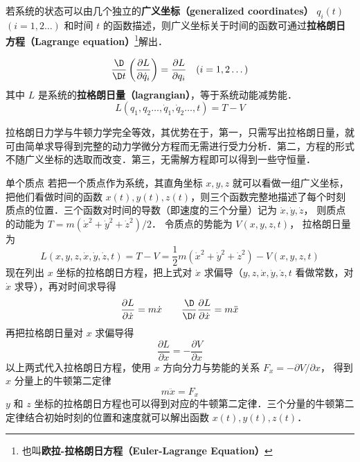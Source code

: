 

若系统的状态可以由几个独立的\textbf{广义坐标（generalized coordinates）} $q_i(t)$ $(i=1,2\dots)$ 和时间 $t$ 的函数描述，则广义坐标关于时间的函数可通过\textbf{拉格朗日方程（Lagrange equation）}\footnote{也叫\textbf{欧拉-拉格朗日方程（Euler-Lagrange Equation）}}解出．

\begin{equation}
\frac{\D}{{\D t}}\left( {\frac{{\partial L}}{{\partial \dot q_i}}} \right) = \frac{{\partial L}}{{\partial q_i}}
\quad (i=1,2\dots)
\end{equation}
其中 $L$ 是系统的\textbf{拉格朗日量（lagrangian）}，等于系统动能减势能．
\begin{equation}
L(q_1,q_2\dots,\dot q_1,\dot q_2\dots,t) = T - V
\end{equation}


拉格朗日力学与牛顿力学完全等效，其优势在于，第一，只需写出拉格朗日量，就可由简单求导得到完整的动力学微分方程而无需进行受力分析．第二，方程的形式不随广义坐标的选取而改变．第三，无需解方程即可以得到一些守恒量．

\begin{exam}{单个质点}\label{Lagrng_ex1}
若把一个质点作为系统，其直角坐标 $x,y,z$ 就可以看做一组广义坐标，把他们看做时间的函数 $x(t), y(t), z(t)$，则三个函数完整地描述了每个时刻质点的位置．三个函数对时间的导数（即速度的三个分量）记为 $\dot x, \dot y, \dot z$， 则质点的动能为 $T=m(\dot x^2+\dot y^2+\dot z^2)/2$． 令质点的势能为 $V(x,y,z,t)$， 拉格朗日量为
\begin{equation}
L(x,y,z, \dot x, \dot y, \dot z, t) = T-V = \frac 12 m(\dot x^2+\dot y^2+\dot z^2) - V(x,y,z,t)
\end{equation}
现在列出 $x$ 坐标的拉格朗日方程，把上式对 $\dot x$ 求偏导（$y,z, \dot x, \dot y, \dot z, t$ 看做常数，对 $\dot x$ 求导），再对时间求导得
\begin{equation}
\frac{{\partial L}}{{\partial \dot x}} = m\dot x
\qquad
\frac{\D}{{\D t}}\frac{{\partial L}}{{\partial \dot x}} = m\ddot x
\end{equation}
再把拉格朗日量对 $x$ 求偏导得
\begin{equation}
\frac{{\partial L}}{{\partial x}} =  - \frac{{\partial V}}{{\partial x}}
\end{equation}
以上两式代入拉格朗日方程，使用 $x$ 方向分力与势能的关系 ${F_x} =  - \partial V/\partial x$， 得到 $x$ 分量上的牛顿第二定律
\begin{equation}
m\ddot x = {F_x}
\end{equation}
$y$ 和 $z$ 坐标的拉格朗日方程也可以得到对应的牛顿第二定律．三个分量的牛顿第二定律结合初始时刻的位置和速度就可以解出函数 $x(t), y(t), z(t)$． 
\end{exam}

